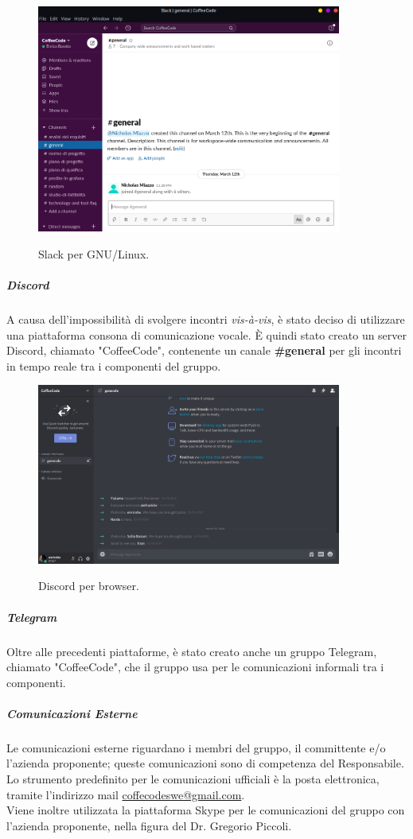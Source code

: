\documentclass[../norme-di-progetto.tex]{subfiles}
\begin{document}
\begin{figure}[H]
  \centering
  \includegraphics[width=10cm]{img/slack.png}
  \label{fig:slack}
  \caption{Slack per GNU/Linux.}
\end{figure}

\subparagraph*{Discord}
A causa dell'impossibilità di svolgere incontri \textit{vis-à-vis}, è stato deciso di utilizzare una piattaforma consona di comunicazione vocale. È quindi stato creato un server Discord, chiamato "CoffeeCode", contenente un canale \textbf{\#general} per gli incontri in tempo reale tra i componenti del gruppo.

\begin{figure}[H]
  \centering
  \includegraphics[width=10cm]{img/discord.png}
  \label{fig:discord}
  \caption{Discord per browser.}
\end{figure}

\subparagraph*{Telegram}
Oltre alle precedenti piattaforme, è stato creato anche un gruppo Telegram, chiamato "CoffeeCode", che il gruppo usa per le comunicazioni informali tra i componenti.

\subparagraph{Comunicazioni Esterne}
Le comunicazioni esterne riguardano i membri del gruppo, il committente e/o l'azienda proponente; queste comunicazioni sono di competenza del Responsabile. Lo strumento predefinito per le comunicazioni ufficiali è la posta elettronica, tramite l'indirizzo mail \href{coffecodeswe@gmail.com}{coffecodeswe@gmail.com}. \\
Viene inoltre utilizzata la piattaforma Skype per le comunicazioni del gruppo con l'azienda proponente, nella figura del Dr. Gregorio Piccoli.
\end{document}
